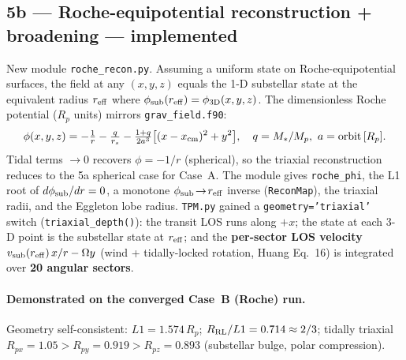 \documentclass[english,a4paper]{kiseon_memo}
\begin{document}
\subsection{5b --- Roche-equipotential reconstruction + broadening --- implemented}
New module \texttt{roche\_recon.py}. Assuming a uniform state on Roche-equipotential surfaces,
the field at any \((x,y,z)\) equals the 1-D substellar state at the equivalent radius
\(r_{\rm eff}\) where \(\phi_{\rm sub}(r_{\rm eff})=\phi_{\rm 3D}(x,y,z)\). The dimensionless
Roche potential (\(R_p\) units) mirrors \texttt{grav\_field.f90}:
\[
\phi(x,y,z) = -\tfrac{1}{r} - \tfrac{q}{r_s}
              - \tfrac{1+q}{2a^3}\big[(x-x_{\rm cm})^2 + y^2\big],
\quad q=M_*/M_p,\ a=\text{orbit}\,[R_p].
\]
Tidal terms \(\to0\) recovers \(\phi=-1/r\) (spherical), so the triaxial reconstruction
reduces to the 5a spherical case for Case~A. The module gives \texttt{roche\_phi}, the L1 root
of \(d\phi_{\rm sub}/dr=0\), a monotone \(\phi_{\rm sub}\!\to\!r_{\rm eff}\) inverse
(\texttt{ReconMap}), the triaxial radii, and the Eggleton lobe radius. \texttt{TPM.py} gained
a \texttt{geometry='triaxial'} switch (\texttt{triaxial\_depth()}): the transit LOS runs along
\(+x\); the state at each 3-D point is the substellar state at \(r_{\rm eff}\); and the
\textbf{per-sector LOS velocity} \(v_{\rm sub}(r_{\rm eff})\,x/r - \Omega y\) (wind +
tidally-locked rotation, Huang Eq.~16) is integrated over \textbf{20 angular sectors}.

\paragraph{Demonstrated on the converged Case~B (Roche) run.} Geometry self-consistent:
\(L1=1.574\,R_p\); \(R_{\rm RL}/L1=0.714\approx2/3\); tidally triaxial \(R_{px}=1.05>
R_{py}=0.919>R_{pz}=0.893\) (substellar bulge, polar compression).
\end{document}
